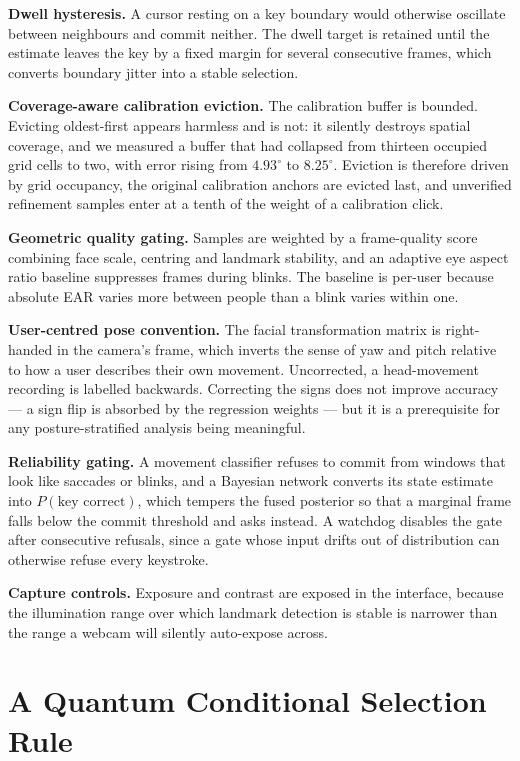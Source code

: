 \documentclass[conference]{IEEEtran}
\begin{document}
\textbf{Dwell hysteresis.} A cursor resting on a key boundary would otherwise
oscillate between neighbours and commit neither. The dwell target is retained
until the estimate leaves the key by a fixed margin for several consecutive
frames, which converts boundary jitter into a stable selection.

\textbf{Coverage-aware calibration eviction.} The calibration buffer is bounded.
Evicting oldest-first appears harmless and is not: it silently destroys spatial
coverage, and we measured a buffer that had collapsed from thirteen occupied
grid cells to two, with error rising from $4.93^\circ$ to $8.25^\circ$. Eviction
is therefore driven by grid occupancy, the original calibration anchors are
evicted last, and unverified refinement samples enter at a tenth of the weight
of a calibration click.

\textbf{Geometric quality gating.} Samples are weighted by a frame-quality score
combining face scale, centring and landmark stability, and an adaptive eye
aspect ratio baseline suppresses frames during blinks. The baseline is per-user
because absolute EAR varies more between people than a blink varies within one.

\textbf{User-centred pose convention.} The facial transformation matrix is
right-handed in the camera's frame, which inverts the sense of yaw and pitch
relative to how a user describes their own movement. Uncorrected, a
head-movement recording is labelled backwards. Correcting the signs does not
improve accuracy --- a sign flip is absorbed by the regression weights --- but it
is a prerequisite for any posture-stratified analysis being meaningful.

\textbf{Reliability gating.} A movement classifier refuses to commit from
windows that look like saccades or blinks, and a Bayesian network converts its
state estimate into $P(\text{key correct})$, which tempers the fused posterior so
that a marginal frame falls below the commit threshold and asks instead. A
watchdog disables the gate after consecutive refusals, since a gate whose input
drifts out of distribution can otherwise refuse every keystroke.

\textbf{Capture controls.} Exposure and contrast are exposed in the interface,
because the illumination range over which landmark detection is stable is
narrower than the range a webcam will silently auto-expose across.

\section{A Quantum Conditional Selection Rule}
\label{sec:rule}
\end{document}

